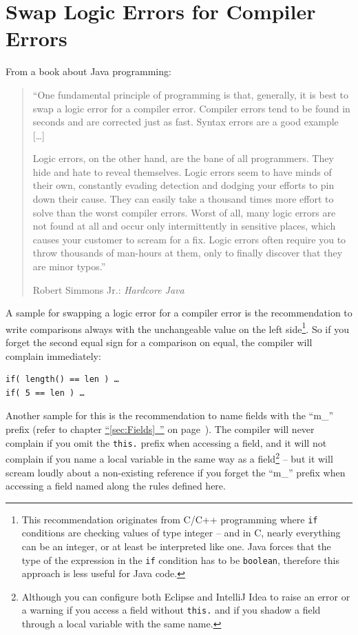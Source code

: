 \documentclass[11pt,a4paper, titlepage, parskip=half, headsepline, footsepline, cleardoublepage=current, headheight=1cm]{scrbook}
\newcommand*{\tqfullvref}[1]{\hyperref[{#1}]{“\ref*{#1}~\nameref*{#1}”} on page~\pageref{#1}}
\begin{document}
\section{Swap Logic Errors for Compiler Errors}
From a book about Java programming:
\begin{quotation}
“One fundamental principle of programming is that, generally, it is best to swap a logic error for a compiler error. Compiler errors tend to be found in seconds and are corrected just as fast. Syntax errors are a good example […]

Logic errors, on the other hand, are the bane of all programmers. They hide and hate to reveal themselves. Logic errors seem to have minds of their own, constantly evading detection and dodging your efforts to pin down their cause. They can easily take a thousand times more effort to solve than the worst compiler errors. Worst of all, many logic errors are not found at all and occur only intermittently in sensitive places, which causes your customer to scream for a fix. Logic errors often require you to throw thousands of man-hours at them, only to finally discover that they are minor typos.”

Robert Simmons Jr.: \textit{Hardcore Java}\autocite{Simmons:HARDCORE_JAVA}
\end{quotation}

A sample for swapping a logic error for a compiler error is the recommendation to write comparisons always with the unchangeable value on the left side\footnote{This recommendation originates from C/C++ programming where \lstinline|if| conditions are checking values of type integer – and in C, nearly everything can be an integer, or at least be interpreted like one. Java forces that the type of the expression in the \lstinline|if| condition has to be \lstinline|boolean|, therefore this approach is less useful for Java code.}. So if you forget the second equal sign for a comparison on equal, the compiler will complain immediately:
\begin{lstlisting}
if( length() == len ) …
if( 5 == len ) …
\end{lstlisting}

Another sample for this is the recommendation to name fields with the “m\_” prefix (refer to chapter \tqfullvref{sec:Fields}). The compiler will never complain if you omit the \lstinline|this.| prefix when accessing a field, and it will not complain if you name a local variable in the same way as a field\footnote{Although you can configure both Eclipse and IntelliJ Idea to raise an error or a warning if you access a field without \lstinline|this.| and if you shadow a field through a local variable with the same name.} – but it will scream loudly about a non-existing reference if you forget the “m\_” prefix when accessing a field named along the rules defined here.
\end{document}
